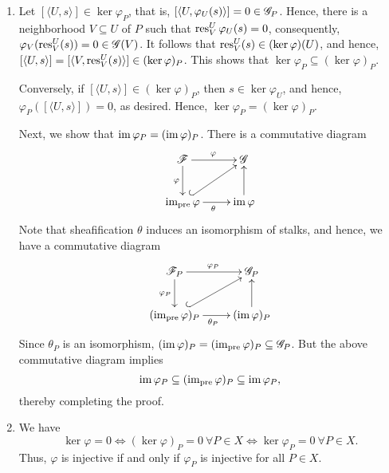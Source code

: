\begin{exercise}
\begin{enumerate}[label=(\alph*)]
    \item Let $[\langle U, s\rangle]\in\ker\varphi_P$, that is, $[\langle U,\varphi_U(s)\rangle] = 0\in\mathscr{G}_P$. Hence, there is a neighborhood $V\subseteq U$ of $P$ such that $\operatorname{res}^U_V\varphi_U(s) = 0$, consequently, $\varphi_V(\operatorname{res}^U_V(s)) = 0\in\mathscr{G}(V)$. It follows that $\operatorname{res}^U_V(s)\in(\ker\varphi)(U)$, and hence, $[\langle U, s\rangle] = [\langle V,\operatorname{res}^U_V(s)\rangle]\in(\ker\varphi)_P$. This shows that $\ker\varphi_P\subseteq(\ker\varphi)_P$.

    Conversely, if $[\langle U, s\rangle]\in(\ker\varphi)_P$, then $s\in\ker\varphi_U$, and hence, $\varphi_P([\langle U, s\rangle]) = 0$, as desired. Hence, $\ker\varphi_P = (\ker\varphi)_P$.

    Next, we show that $\operatorname{im}\varphi_P = (\operatorname{im}\varphi)_P$. There is a commutative diagram 
    \begin{equation*}
        \xymatrix {
            \scrF\ar[r]^\varphi\ar[d]_\varphi & \scrG\\
            \im_{\pre}\varphi\ar[r]_\theta\ar@{^{(}->}[ru]& \im\varphi\ar[u]
        }
    \end{equation*}
    Note that sheafification $\theta$ induces an isomorphism of stalks, and hence, we have a commutative diagram 
    \begin{equation*}
        \xymatrix {
            \scrF_P\ar[r]^{\varphi_P}\ar[d]_{\varphi_P} & \scrG_P\\
            (\im_{\pre}\varphi)_P\ar[r]_{\theta_P}\ar@{^{(}->}[ru] & (\im\varphi)_P\ar[u]
        }
    \end{equation*}
    Since $\theta_P$ is an isomorphism, $(\operatorname{im}\varphi)_P = (\operatorname{im}_{\mathrm{pre}}\varphi)_P\subseteq\mathscr{G}_P$. But the above commutative diagram implies 
    \begin{equation*}
        \operatorname{im}\varphi_P\subseteq(\operatorname{im}_{\mathrm{pre}}\varphi)_P\subseteq\operatorname{im}\varphi_P,
    \end{equation*}
    thereby completing the proof.

    \item We have 
    \begin{equation*}
        \ker\varphi = 0\iff(\ker\varphi)_P = 0~\forall P\in X\iff\ker\varphi_P = 0~\forall P\in X.
    \end{equation*}
    Thus, $\varphi$ is injective if and only if $\varphi_P$ is injective for all $P\in X$.


\end{enumerate}
\end{exercise}
